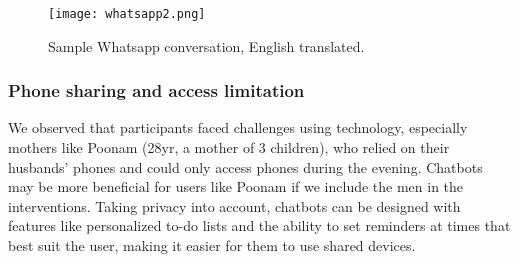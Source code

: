 \begin{figure}[htp]
\centerline{\texttt{[image: whatsapp2.png]}}
\caption{Sample Whatsapp conversation, English translated.}
\label{fig:whats2}
\end{figure}






\subsubsection{Phone sharing and access limitation}
We observed that participants faced challenges using technology, especially mothers like Poonam (28yr, a mother of 3 children), who relied on their husbands' phones and could only access phones during the evening. Chatbots may be more beneficial for users like Poonam if we include the men in the interventions. Taking privacy into account, chatbots can be designed with features like personalized to-do lists and the ability to set reminders at times that best suit the user, making it easier for them to use shared devices.




